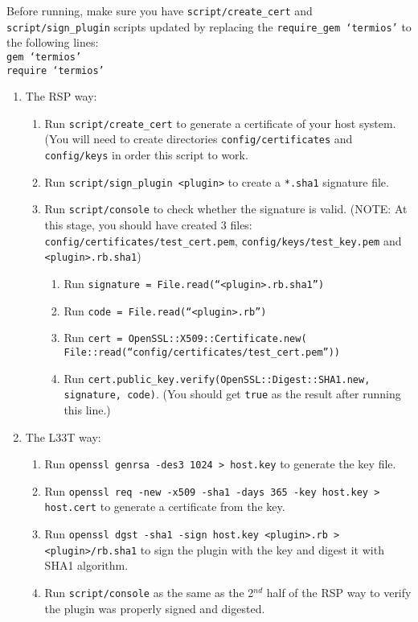 \documentclass{article}
\begin{document}
Before running, make sure you have \texttt{script/create\_cert} and \texttt{script/sign\_plugin} scripts updated by replacing the \texttt{require\_gem `termios'} to the following lines: \\

\texttt{gem `termios'} \\
\texttt{require `termios'}

\begin{enumerate}
	\item The RSP way:
		\begin{enumerate}
			\item Run \texttt{script/create\_cert} to generate a certificate of your host system. (You will need to create directories \texttt{config/certificates} and \texttt{config/keys} in order this script to work. 
			\item Run \texttt{script/sign\_plugin <plugin>} to create a \texttt{*.sha1} signature file. 
			\item Run \texttt{script/console} to check whether the signature is valid. (NOTE: At this stage, you should have created 3 files: \texttt{config/certificates/test\_cert.pem}, \texttt{config/keys/test\_key.pem} and \texttt{<plugin>.rb.sha1})
				\begin{enumerate}
					\item Run \texttt{signature = File.read(``<plugin>.rb.sha1'')}
					\item Run \texttt{code = File.read(``<plugin>.rb'')}
					\item Run \texttt{cert = OpenSSL::X509::Certificate.new( \\ File::read(``config/certificates/test\_cert.pem''))}
					\item Run \texttt{cert.public\_key.verify(OpenSSL::Digest::SHA1.new, signature, code)}. (You should get \texttt{true} as the result after running this line.)
				\end{enumerate}
		\end{enumerate}
	\item The L33T way:
		\begin{enumerate}
			\item Run \texttt{openssl genrsa -des3 1024 > host.key} to generate the key file.
			\item Run \texttt{openssl req -new -x509 -sha1 -days 365 -key host.key > host.cert} to generate a certificate from the key.
			\item Run \texttt{openssl dgst -sha1 -sign host.key <plugin>.rb > <plugin>/rb.sha1} to sign the plugin with the key and digest it with SHA1 algorithm.
			\item Run \texttt{script/console} as the same as the 2$^{nd}$ half of the RSP way to verify the plugin was properly signed and digested. 
		\end{enumerate}
\end{enumerate}
\end{document}
